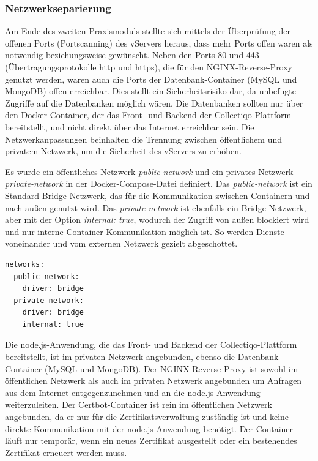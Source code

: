 \subsubsection{Netzwerkseparierung}\label{subsubsec:vserver-netzwerk-separation}

Am Ende des zweiten Praxismoduls stellte sich mittels der Überprüfung der offenen Ports (Portscanning) des vServers heraus, dass mehr Ports offen waren als notwendig beziehungsweise gewünscht.
Neben den Ports 80 und 443 (Übertragungsprotokolle http und https), die für den NGINX-Reverse-Proxy genutzt werden, waren auch die Ports der Datenbank-Container (MySQL und MongoDB) offen erreichbar.
Dies stellt ein Sicherheitsrisiko dar, da unbefugte Zugriffe auf die Datenbanken möglich wären.
Die Datenbanken sollten nur über den Docker-Container, der das Front- und Backend der Collectiqo-Plattform bereitstellt, und nicht direkt über das Internet erreichbar sein.
Die Netzwerkanpassungen beinhalten die Trennung zwischen öffentlichem und privatem Netzwerk, um die Sicherheit des vServers zu erhöhen.

Es wurde ein öffentliches Netzwerk \textit{public-network} und ein privates Netzwerk \textit{private-network} in der Docker-Compose-Datei definiert.
Das \textit{public-network} ist ein Standard-Bridge-Netzwerk, das für die Kommunikation zwischen Containern und nach außen genutzt wird.
Das \textit{private-network} ist ebenfalls ein Bridge-Netzwerk, aber mit der Option \textit{internal: true}, wodurch der Zugriff von außen blockiert wird und nur interne Container-Kommunikation möglich ist.
So werden Dienste voneinander und vom externen Netzwerk gezielt abgeschottet.

\vspace{1em}
\begin{lstlisting}[label={lst:lst-dockercompose-networks}, caption=Netzwerke in der Docker-Compose-Datei]
networks:
  public-network:
    driver: bridge
  private-network:
    driver: bridge
    internal: true
\end{lstlisting}
\vspace{1em}

Die node.js-Anwendung, die das Front- und Backend der Collectiqo-Plattform bereitstellt, ist im privaten Netzwerk angebunden, ebenso die Datenbank-Container (MySQL und MongoDB).
Der NGINX-Reverse-Proxy ist sowohl im öffentlichen Netzwerk als auch im privaten Netzwerk angebunden um Anfragen aus dem Internet entgegenzunehmen und an die node.js-Anwendung weiterzuleiten.
Der Certbot-Container ist rein im öffentlichen Netzwerk angebunden, da er nur für die Zertifikatsverwaltung zuständig ist und keine direkte Kommunikation mit der node.js-Anwendung benötigt.
Der Container läuft nur temporär, wenn ein neues Zertifikat ausgestellt oder ein bestehendes Zertifikat erneuert werden muss.


